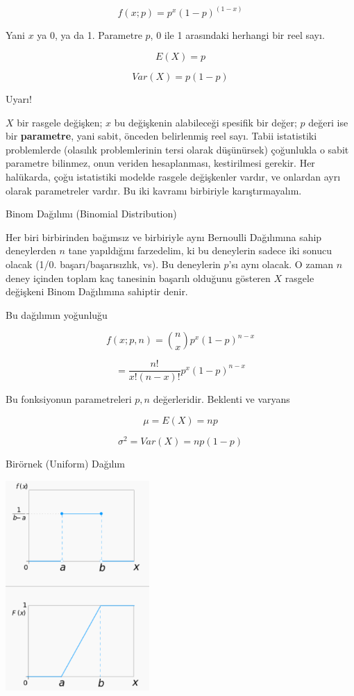 \documentclass[12pt,fleqn]{article}\usepackage{../../common}
\begin{document}
$$ f(x;p) = p^x(1-p)^{(1-x)} $$

Yani $x$ ya 0, ya da 1. Parametre $p$, 0 ile 1 arasındaki herhangi bir reel 
sayı. 

$$ E(X) = p $$

$$ Var(X) = p(1-p) $$

Uyarı!

$X$ bir rasgele değişken; $x$ bu değişkenin alabileceği spesifik bir değer;
$p$ değeri ise bir \textbf{parametre}, yani sabit, önceden belirlenmiş reel
sayı. Tabii istatistiki problemlerde (olasılık problemlerinin tersi olarak
düşünürsek) çoğunlukla o sabit parametre bilinmez, onun veriden
hesaplanması, kestirilmesi gerekir. Her halükarda, çoğu istatistiki modelde
rasgele değişkenler vardır, ve onlardan ayrı olarak parametreler vardır. Bu
iki kavramı birbiriyle karıştırmayalım.

Binom Dağılımı (Binomial Distribution)

Her biri birbirinden bağımsız ve birbiriyle aynı Bernoulli Dağılımına sahip
deneylerden $n$ tane yapıldığını farzedelim, ki bu deneylerin sadece iki
sonucu olacak (1/0. başarı/başarısızlık, vs). Bu deneylerin $p$'sı aynı
olacak. O zaman $n$ deney içinden toplam kaç tanesinin başarılı olduğunu
gösteren $X$ rasgele değişkeni Binom Dağılımına sahiptir denir. 

Bu dağılımın yoğunluğu 

$$ f(x;p,n) = {n \choose{x}} p^x(1-p)^{n-x} $$

$$ = \frac{n!}{x!(n-x)!} p^x(1-p)^{n-x}  $$

Bu fonksiyonun parametreleri $p,n$ değerleridir. Beklenti ve varyans

$$ \mu = E(X) = np $$

$$ \sigma^2 = Var(X) = np(1-p) $$

Birörnek (Uniform) Dağılım

\includegraphics[height=8cm]{stat_intro_05.png}
\end{document}
